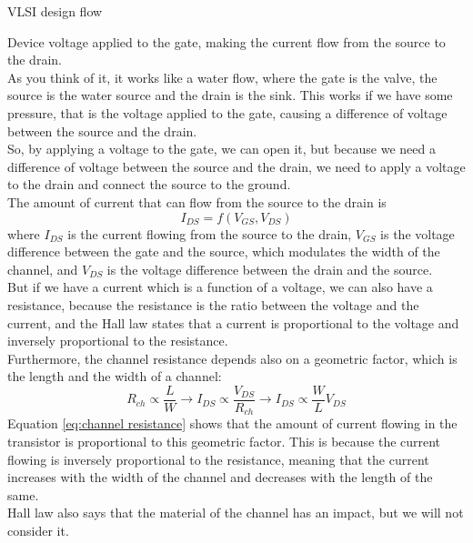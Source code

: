 \begin{section}{VLSI design flow}
\begin{subsection}{Device}
    voltage applied to the gate, making the current flow from the source to the drain.\\
    As you think of it, it works like a water flow, where the gate is the valve, the source is the
    water source and the drain is the sink. This works if we have some pressure, that is the voltage
    applied to the gate, causing a difference of voltage between the source and the drain.\\
    So, by applying a voltage to the gate, we can open it, but because we need a difference of
    voltage between the source and the drain, we need to apply a voltage to the drain and connect 
    the source to the ground.\\
    The amount of current that can flow from the source to the drain is 
    \begin{equation}
      I_{DS} = f(V_{GS}, V_{DS})
    \end{equation}
    where $I_{DS}$ is the current flowing from the source to the drain, $V_{GS}$ is the voltage
    difference between the gate and the source, which modulates the width of the channel, and 
    $V_{DS}$ is the voltage difference between the drain and the source.\\
    But if we have a current which is a function of a voltage, we can also have a resistance, because
    the resistance is the ratio between the voltage and the current, and the Hall law states that
    a current is proportional to the voltage and inversely proportional to the resistance.\\
    Furthermore, the channel resistance depends also on a geometric factor, which is the length and
    the width of a channel:
    \begin{equation}
      R_{ch} \varpropto \frac{L}{W} \to I_{DS}  \varpropto \frac{V_{DS}}{R_{ch}}\to I_{DS} \varpropto \frac{W}{L} V_{DS}
      \label{eq:channel resistance}
    \end{equation}
    Equation \ref{eq:channel resistance} shows that the amount of current flowing in the transistor
    is proportional to this geometric factor. This is because the current flowing is inversely
    proportional to the resistance, meaning that the current increases with the width of the channel
    and decreases with the length of the same.\\
    Hall law also says that the material of the channel has an impact, but we will not consider it.\\


\end{subsection}
\end{section}
